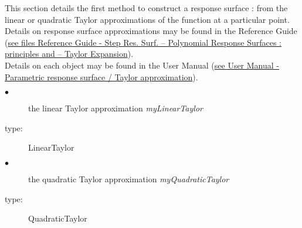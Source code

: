 \renewcommand{\filename}{docUC_RespSurface_TaylorApprox.tex}
\renewcommand{\filetitle}{UC : Linear and Quadratic Taylor approximations}

\HeaderIIILevel

\label{taylorApprox}


This section details the first method to construct a response surface : from the linear or quadratic Taylor approximations of the function at a particular point.\\

Details on response surface approximations may be found in the Reference Guide (\href{OpenTURNS_ReferenceGuide.pdf}{see files Reference Guide - Step Res. Surf. -- Polynomial Response Surfaces : principles and -- Taylor Expansion}).\\

Details on each object may be found in the User Manual  (\href{OpenTURNS_UserManual_TUI.pdf}{see User Manual - Parametric response surface / Taylor approximation}).\\

{
  \begin{description}
  \item[$\bullet$] the linear Taylor approximation {\itshape myLinearTaylor}
  \item[type:]  LinearTaylor
  \item[$\bullet$] the quadratic Taylor approximation {\itshape myQuadraticTaylor}
  \item[type:]  QuadraticTaylor
  \end{description}
}

